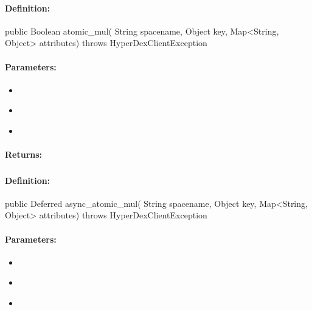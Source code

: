 \paragraph{Definition:}
\begin{javacode}
public Boolean atomic_mul(
        String spacename,
        Object key,
        Map<String, Object> attributes) throws HyperDexClientException
\end{javacode}

\paragraph{Parameters:}
\begin{itemize}[noitemsep]
\item {}\\

\item {}\\

\item {}\\

\end{itemize}

\paragraph{Returns:}


\pagebreak
\subsubsection{}
\label{api:java:async_atomic_mul}


\paragraph{Definition:}
\begin{javacode}
public Deferred async_atomic_mul(
        String spacename,
        Object key,
        Map<String, Object> attributes) throws HyperDexClientException
\end{javacode}

\paragraph{Parameters:}
\begin{itemize}[noitemsep]
\item {}\\

\item {}\\

\item {}\\

\end{itemize}


